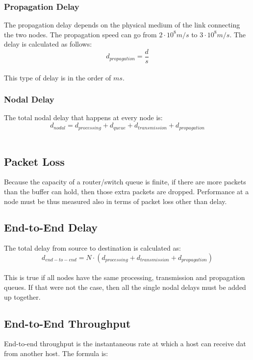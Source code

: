 \documentclass{article}
\begin{document}
\subsubsection{Propagation Delay}
The propagation delay depends on the physical medium of the link connecting the two nodes. The propagation speed can go from $2 \cdot 10^8 m/s$ to $3 \cdot 10^8 m/s$. The delay is calculated as follows: \\

	\[ d_{propagation} = \frac{d}{s} \] \\
	
\noindent This type of delay is in the order of $ms$.

\subsubsection{Nodal Delay}
The total nodal delay that happens at every node is: \\

	\[ d_{nodal} = d_{processing} + d_{queue} + d_{transmission} + d_{propagation} \] \
	
\subsection{Packet Loss}
Because the capacity of a router/switch queue is finite, if there are more packets than the buffer can hold, then those extra packets are dropped. Performance at a node must be thus measured also in terms of packet loss other than delay.

\subsection{End-to-End Delay}
The total delay from source to destination is calculated as: \\

	\[ d_{end-to-end} = N \cdot (d_{processing} + d_{transmission} + d_{propagation}) \] \\
This is true if all nodes have the same processing, transmission and propagation queues. If that were not the case, then all the single nodal delays must be added up together.

\subsection{End-to-End Throughput}
End-to-end throughput is the instantaneous rate at which a host can receive dat from another host. The formula is: \\
\end{document}
